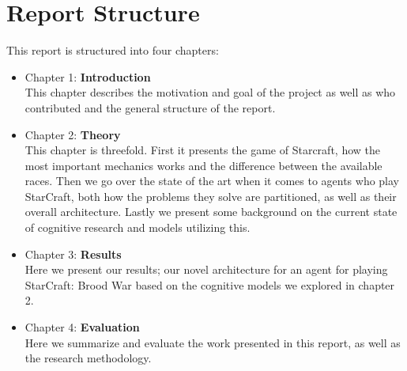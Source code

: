\section{Report Structure}
\label{sec:structure}
This report is structured into four chapters:
\begin{itemize}
\item Chapter 1: \textbf{Introduction} \\
This chapter describes the motivation and goal of the project as well as who contributed and the general structure of the report.
\item Chapter 2: \textbf{Theory} \\
This chapter is threefold. First it presents the game of Starcraft, how the most important mechanics works and the difference between the
available races. Then we go over the state of the art when it comes to agents
who play StarCraft, both how the problems they solve are partitioned, as well
as their overall architecture. Lastly we present some background on the current state of cognitive research and models
utilizing this.
\item Chapter 3: \textbf{Results} \\
Here we present our results; our novel architecture for an agent for playing
StarCraft: Brood War based on the cognitive models we explored in chapter 2.
\item Chapter 4: \textbf{Evaluation} \\
Here we summarize and evaluate the work presented in this report, as well as the research methodology.

\end{itemize}